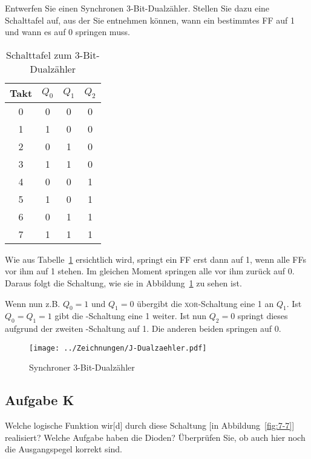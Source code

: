 \begin{problem}
    Entwerfen Sie einen Synchronen 3-Bit-Dualzähler. Stellen Sie dazu eine
    Schalttafel auf, aus der Sie entnehmen können, wann ein bestimmtes FF auf 1
    und wann es auf 0 springen muss.
\end{problem}

\begin{table}
    \centering
    \begin{tabular}{c|ccc}
        Takt & $Q_0$ & $Q_1$ & $Q_2$\\
        \hline
        0 & 0 & 0 & 0\\
        1 & 1 & 0 & 0\\
        2 & 0 & 1 & 0\\
        3 & 1 & 1 & 0\\
        4 & 0 & 0 & 1\\
        5 & 1 & 0 & 1\\
        6 & 0 & 1 & 1\\
        7 & 1 & 1 & 1\\
    \end{tabular}
    \caption{%
        Schalttafel zum 3-Bit-Dualzähler
    }
    \label{tab:Aufgabe_J}
\end{table}

Wie aus Tabelle~\ref{tab:Aufgabe_J} ersichtlich wird, springt ein FF erst dann
auf 1, wenn alle FFs vor ihm auf 1 stehen. Im gleichen Moment springen alle vor
ihm zurück auf 0. Daraus folgt die Schaltung, wie sie in
Abbildung~\ref{fig:J-Dualzähler} zu sehen ist.

Wenn nun z.B. $Q_0 = 1$ und $Q_1 = 0$ übergibt die \textsc{xor}-Schaltung eine
1 an $Q_1$. Ist  $Q_0 = Q_1 = 1$ gibt die \tand-Schaltung eine 1 weiter. Ist
nun $Q_2 = 0$ springt dieses aufgrund der zweiten \txor-Schaltung auf 1. Die
anderen beiden springen auf 0.

\begin{figure}
    \centering
    \texttt{[image: ../Zeichnungen/J-Dualzaehler.pdf]}
    \caption{%
        Synchroner 3-Bit-Dualzähler
    }
    \label{fig:J-Dualzähler}
\end{figure}

\FloatBarrier
\subsection{Aufgabe K}

\begin{problem}
	Welche logische Funktion wir[d] durch diese Schaltung [in
	Abbildung~\ref{fig:7-7}] realisiert? Welche Aufgabe haben die Dioden?
	Überprüfen Sie, ob auch hier noch die Ausgangspegel korrekt sind.
\end{problem}

